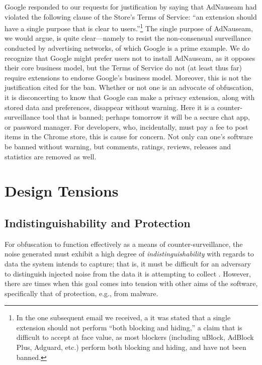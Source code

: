 \documentclass[conference]{IEEEtran}
\begin{document}
Google responded to our requests for justification by saying that AdNauseam had violated the following clause of the Store's Terms of Service: “an extension should have a single purpose that is clear to users.”\footnote{In the one subsequent email we received, a it was stated that a single extension should not perform “both blocking and hiding,” a claim that is difficult to accept at face value, as most blockers (including uBlock, AdBlock Plus, Adguard, etc.) perform both blocking and hiding, and have not been banned.} The single purpose of AdNauseam, we would argue, is quite clear---namely to resist the non-consensual surveillance conducted by advertising networks, of which Google is a prime example. We do recognize that Google might prefer users not to install AdNauseam, as it opposes their core business model, but the Terms of Service do not (at least thus far) require extensions to endorse Google's business model. Moreover, this is not the justification cited for the ban. Whether or not one is an advocate of obfuscation, it is disconcerting to know that Google can make a privacy extension, along with stored data and preferences, disappear without warning. Here it is a counter-surveillance tool that is banned; perhaps tomorrow it will be a secure chat app, or password manager. For developers, who, incidentally, must pay a fee to post items in the Chrome store, this is cause for concern. Not only can one's software be banned without warning, but comments, ratings, reviews, releases and statistics are removed as well.


\section{Design Tensions}

\subsection{Indistinguishability and Protection}

For obfuscation to function effectively as a means of counter-surveillance, the noise generated must exhibit a high degree of \emph{indistinguishability} with regards to data the system intends to capture; that is, it must be difficult for an adversary to distinguish injected noise from the data it is attempting to collect \cite{Gervais}. However, there are times when this goal comes into tension with other aims of the software, specifically that of protection, e.g., from malware.
\end{document}
